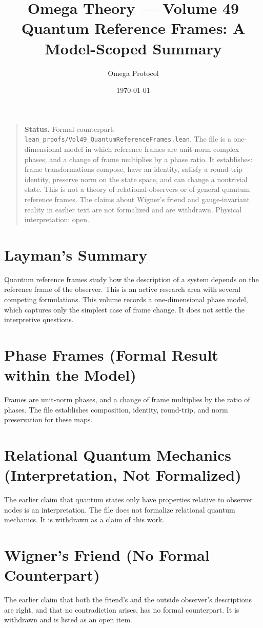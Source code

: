 \documentclass[11pt, a4paper]{article}
\title{Omega Theory --- Volume 49\\\Large Quantum Reference Frames: A Model-Scoped Summary}
\author{Omega Protocol}
\date{\today}
\begin{document}
\maketitle

\begin{quote}
\textbf{Status.} Formal counterpart: \texttt{lean\_proofs/Vol49\_QuantumReferenceFrames.lean}. The file is a one-dimensional model in which reference frames are unit-norm complex phases, and a change of frame multiplies by a phase ratio. It establishes: frame transformations compose, have an identity, satisfy a round-trip identity, preserve norm on the state space, and can change a nontrivial state. This is not a theory of relational observers or of general quantum reference frames. The claims about Wigner's friend and gauge-invariant reality in earlier text are not formalized and are withdrawn. Physical interpretation: open.
\end{quote}

\section*{Layman's Summary}
Quantum reference frames study how the description of a system depends on the reference frame of the observer. This is an active research area with several competing formulations. This volume records a one-dimensional phase model, which captures only the simplest case of frame change. It does not settle the interpretive questions.

\section{Phase Frames (Formal Result within the Model)}
Frames are unit-norm phases, and a change of frame multiplies by the ratio of phases. The file establishes composition, identity, round-trip, and norm preservation for these maps.

\section{Relational Quantum Mechanics (Interpretation, Not Formalized)}
The earlier claim that quantum states only have properties relative to observer nodes is an interpretation. The file does not formalize relational quantum mechanics. It is withdrawn as a claim of this work.

\section{Wigner's Friend (No Formal Counterpart)}
The earlier claim that both the friend's and the outside observer's descriptions are right, and that no contradiction arises, has no formal counterpart. It is withdrawn and is listed as an open item.
\end{document}
